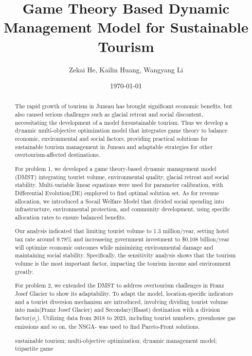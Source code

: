 \documentclass{mcmthesis}
\title{Game Theory Based Dynamic Management Model for Sustainable Tourism}
\author{Zekai He, Kailin Huang, Wangyang Li}
\date{\today}
\begin{document}
\begin{abstract}
\par 
The rapid growth of tourism in Juneau has brought significant economic benefits,
but also caused serious challenges such as glacial retreat and social discontent, 
necessitating the development of a model forsustainable tourism.
Thus we develop a dynamic multi-objective optimization model that integrates 
game theory to balance economic, environmental and social factors, providing
practical solutions for sustainable tourism management in Juneau and 
adaptable strategies for other overtourism-affected destinations.

For problem 1, we developed a game theory-based dynamic management model (DMST)
integrating tourist volume, environmental quality, glacial retreat and social stability.
Multi-variable linear equations were used for parameter calibration, with Differential
Evolution(DE) employed to find optimal solution set.
As for revenue allocation, we introduced a Socail Welfare Model that divided social spending into 
infrastructure, environmental protection, and community development, 
using specific allocation rates to ensure balanced benefits.

Our analysis indicated that limiting tourist volume to 1.3 million/year, setting hotel tax rate
around 9.78\% and increaseing government investment to \$0.108 billion/year will optimize 
economic outcomes while minimizing environmental damage and maintaining social stability.
Specifically, the sensitivity analysis shows that the tourism volume is the most important 
factor, impacting the tourism income and environment greatly.

For problem 2, we extended the DMST to address overtourism challenges in Franz Josef Glacier 
to show its adaptability. To adapt the model, location-specific indicators and a tourist diversion
mechanism are introduced, involving dividing tourist volume into main(Franz Josef Glacier) and 
Secondary(Haast) destination with a division factor($\phi_t$). Utilizing data from 2018 to 2023, 
including tourist numbers, greenhouse gas emissions and so on, the NSGA-\uppercase\expandafter{}
was used to find Pareto-Front solutions.





\begin{keywords}
sustainable tourism; multi-objective optimization; dynamic management model; tripartite game
\end{keywords}
\end{abstract}
\maketitle
\tableofcontents
\newpage
%
\end{document}
